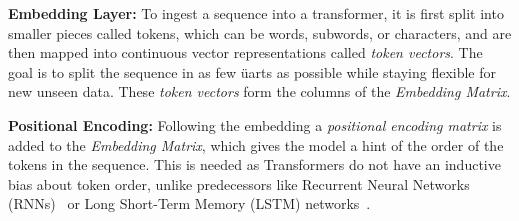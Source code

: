 \textbf{Embedding Layer:} To ingest a sequence into a transformer, it is first split into smaller pieces called tokens, which can be words, subwords, or characters, and are then mapped into continuous vector representations called \emph{token vectors}.
The goal is to split the sequence in as few üarts as possible while staying flexible for new unseen data. 
These \emph{token vectors} form the columns of the \emph{Embedding Matrix}.

\textbf{Positional Encoding:} Following the embedding a \emph{positional encoding matrix} is added to the \emph{Embedding Matrix}, which gives the model a hint of the order of the tokens in the sequence. 
This is needed as Transformers do not have an inductive bias about token order, unlike predecessors like Recurrent Neural Networks (RNNs)~\cite{Salehinejad2018} or Long Short-Term Memory (LSTM) networks~\cite{Hochreiter1997}.

